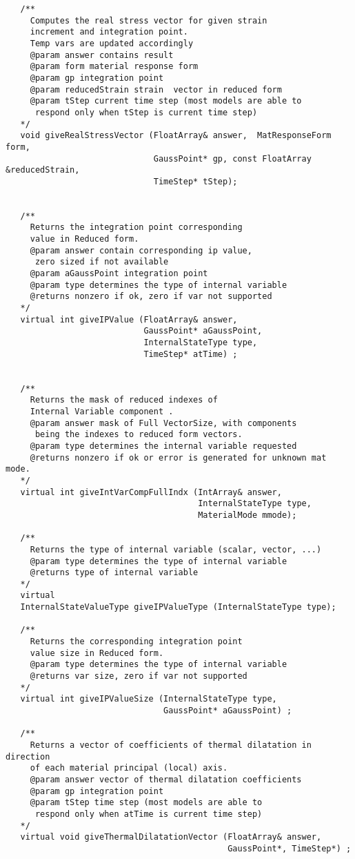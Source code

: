\documentclass[a4paper]{article}
\begin{document}
{\begin{verbatim}
   /**
     Computes the real stress vector for given strain 
     increment and integration point. 
     Temp vars are updated accordingly
     @param answer contains result
     @param form material response form
     @param gp integration point 
     @param reducedStrain strain  vector in reduced form
     @param tStep current time step (most models are able to 
      respond only when tStep is current time step)
   */
   void giveRealStressVector (FloatArray& answer,  MatResponseForm form, 
                              GaussPoint* gp, const FloatArray &reducedStrain, 
                              TimeStep* tStep);


   /**
     Returns the integration point corresponding 
     value in Reduced form.
     @param answer contain corresponding ip value, 
      zero sized if not available
     @param aGaussPoint integration point
     @param type determines the type of internal variable
     @returns nonzero if ok, zero if var not supported
   */
   virtual int giveIPValue (FloatArray& answer, 
                            GaussPoint* aGaussPoint, 
                            InternalStateType type, 
                            TimeStep* atTime) ;


   /**
     Returns the mask of reduced indexes of 
     Internal Variable component .
     @param answer mask of Full VectorSize, with components 
      being the indexes to reduced form vectors.
     @param type determines the internal variable requested
     @returns nonzero if ok or error is generated for unknown mat mode.
   */
   virtual int giveIntVarCompFullIndx (IntArray& answer, 
                                       InternalStateType type, 
                                       MaterialMode mmode);

   /**
     Returns the type of internal variable (scalar, vector, ...)
     @param type determines the type of internal variable
     @returns type of internal variable
   */
   virtual 
   InternalStateValueType giveIPValueType (InternalStateType type);

   /**
     Returns the corresponding integration point  
     value size in Reduced form.
     @param type determines the type of internal variable
     @returns var size, zero if var not supported
   */
   virtual int giveIPValueSize (InternalStateType type, 
                                GaussPoint* aGaussPoint) ;

   /**
     Returns a vector of coefficients of thermal dilatation in direction
     of each material principal (local) axis.
     @param answer vector of thermal dilatation coefficients
     @param gp integration point
     @param tStep time step (most models are able to 
      respond only when atTime is current time step)
   */
   virtual void giveThermalDilatationVector (FloatArray& answer, 
                                             GaussPoint*, TimeStep*) ;




\end{verbatim}}
\end{document}
